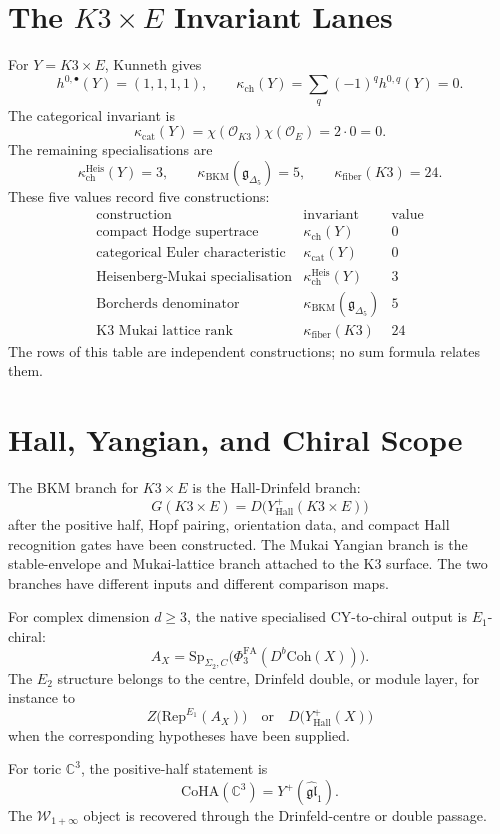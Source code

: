 \documentclass[11pt]{article}
\providecommand{\C}{\mathbb{C}}
\providecommand{\Rep}{\mathrm{Rep}}
\providecommand{\CoHA}{\mathrm{CoHA}}
\providecommand{\kBKM}{\kappa_{\mathrm{BKM}}}
\providecommand{\kch}{\kappa_{\mathrm{ch}}}
\providecommand{\kcat}{\kappa_{\mathrm{cat}}}
\providecommand{\kfib}{\kappa_{\mathrm{fiber}}}
\providecommand{\kHeis}{\kappa_{\mathrm{ch}}^{\mathrm{Heis}}}
\providecommand{\cO}{\mathcal{O}}
\providecommand{\fg}{\mathfrak{g}}
\providecommand{\Dfive}{\Delta_5}
\begin{document}
\section{The \(K3\times E\) Invariant Lanes}

For \(Y=K3\times E\), Kunneth gives
\[
  h^{0,\bullet}(Y)=(1,1,1,1),\qquad
  \kch(Y)=\sum_q(-1)^q h^{0,q}(Y)=0.
\]
The categorical invariant is
\[
  \kcat(Y)=\chi(\cO_{K3})\chi(\cO_E)=2\cdot 0=0.
\]
The remaining specialisations are
\[
  \kHeis(Y)=3,\qquad
  \kBKM(\fg_{\Dfive})=5,\qquad
  \kfib(K3)=24.
\]
These five values record five constructions:
\[
\begin{array}{c|c|c}
\text{construction} & \text{invariant} & \text{value}\\
\hline
\text{compact Hodge supertrace} & \kch(Y) & 0\\
\text{categorical Euler characteristic} & \kcat(Y) & 0\\
\text{Heisenberg-Mukai specialisation} & \kHeis(Y) & 3\\
\text{Borcherds denominator} & \kBKM(\fg_{\Dfive}) & 5\\
\text{K3 Mukai lattice rank} & \kfib(K3) & 24
\end{array}
\]
The rows of this table are independent constructions; no sum formula
relates them.

\section{Hall, Yangian, and Chiral Scope}

The BKM branch for \(K3\times E\) is the Hall-Drinfeld branch:
\[
  G(K3\times E)=D\bigl(Y^+_{\mathrm{Hall}}(K3\times E)\bigr)
\]
after the positive half, Hopf pairing, orientation data, and compact
Hall recognition gates have been constructed.  The Mukai Yangian
branch is the stable-envelope and Mukai-lattice branch attached to the
K3 surface.  The two branches have different inputs and different
comparison maps.

For complex dimension \(d\geq3\), the native specialised
CY-to-chiral output is \(E_1\)-chiral:
\[
  A_X=\mathrm{Sp}_{\Sigma_2,C}
  \bigl(\Phi^{\mathrm{FA}}_3(D^b\mathrm{Coh}(X))\bigr).
\]
The \(E_2\) structure belongs to the centre, Drinfeld double, or module
layer, for instance to
\[
  Z\bigl(\Rep^{E_1}(A_X)\bigr)
  \quad\text{or}\quad
  D\bigl(Y^+_{\mathrm{Hall}}(X)\bigr)
\]
when the corresponding hypotheses have been supplied.

For toric \(\C^3\), the positive-half statement is
\[
  \CoHA(\C^3)=Y^+(\widehat{\mathfrak{gl}}_1).
\]
The \(\mathcal W_{1+\infty}\) object is recovered through the
Drinfeld-centre or double passage.
\end{document}
